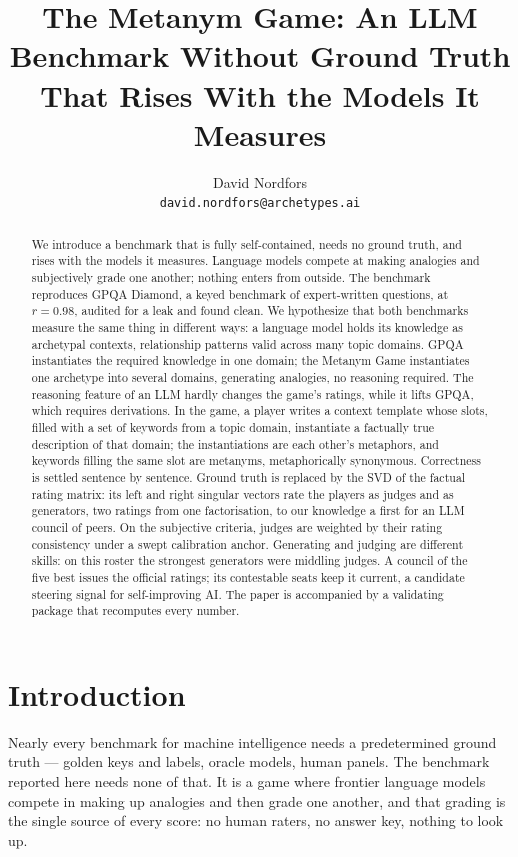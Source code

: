 \documentclass{article}
\title{The Metanym Game: An LLM Benchmark Without Ground Truth That Rises With the Models It Measures}
\author{David Nordfors \\ \texttt{david.nordfors@archetypes.ai}}
\begin{document}
\maketitle
{}
\begin{abstract}

We introduce a benchmark that is fully self-contained, needs no ground truth, and rises with the models it measures. Language models compete at making analogies and subjectively grade one another; nothing enters from outside. The benchmark reproduces GPQA Diamond, a keyed benchmark of expert-written questions, at \(r = 0.98\), audited for a leak and found clean. We hypothesize that both benchmarks measure the same thing in different ways: a language model holds its knowledge as archetypal contexts, relationship patterns valid across many topic domains. GPQA instantiates the required knowledge in one domain; the Metanym Game instantiates one archetype into several domains, generating analogies, no reasoning required. The reasoning feature of an LLM hardly changes the game's ratings, while it lifts GPQA, which requires derivations. In the game, a player writes a context template whose slots, filled with a set of keywords from a topic domain, instantiate a factually true description of that domain; the instantiations are each other's metaphors, and keywords filling the same slot are metanyms, metaphorically synonymous. Correctness is settled sentence by sentence. Ground truth is replaced by the SVD of the factual rating matrix: its left and right singular vectors rate the players as judges and as generators, two ratings from one factorisation, to our knowledge a first for an LLM council of peers. On the subjective criteria, judges are weighted by their rating consistency under a swept calibration anchor. Generating and judging are different skills: on this roster the strongest generators were middling judges. A council of the five best issues the official ratings; its contestable seats keep it current, a candidate steering signal for self-improving AI. The paper is accompanied by a validating package that recomputes every number.

\end{abstract}
\section{Introduction}\label{introduction}

Nearly every benchmark for machine intelligence needs a predetermined ground truth --- golden keys and labels, oracle models, human panels. The benchmark reported here needs none of that. It is a game where frontier language models compete in making up analogies and then grade one another, and that grading is the single source of every score: no human raters, no answer key, nothing to look up.
\end{document}
